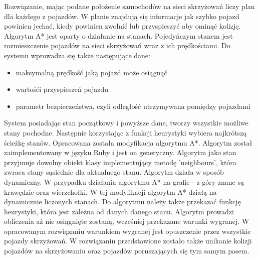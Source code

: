 Rozwiązanie, mając podane położenie samochodów na sieci skrzyżowań liczy plan dla każdego z pojazdów. W planie znajdują się informacje jak szybko pojazd powinien jechać, kiedy powinien zwolnić lub przyspieszyć aby ominąć kolizję.
\newline
\newline
Algorytm A* jest oparty o działanie na stanach. Pojedyńczym stanem jest rozmieszczenie pojazdów na sieci skrzyżowań wraz z ich prędkościami.
\newline
\newline
Do systemu wprowadza się także następujące dane:
\begin{itemize}
\item maksymalną prędkość jaką pojazd może osiągnąć
\item wartośći przyspieszeń pojazdu
\item parametr bezpieczeństwa, czyli odległość utrzymywana pomiędzy pojazdami
\end{itemize}
System posiadając stan początkowy i powyższe dane, tworzy wszystkie możliwe stany pochodne. Następnie korzystając z funkcji heurystyki wybiera najkrótszą ścieżkę stanów.
\newline
\newline
Opracowana została modyfikacja algorytmu A*. Algorytm został zaimplementowany w języku Ruby i jest on generyczny. Algorytm jako stan przyjmuje dowolny obiekt klasy implementujący metodę 'neighbours', która zwraca stany sąsiednie dla aktualnego stanu.
\newline
\newline
Algorytm działa w sposób dynamiczny. W przypadku działania algorytmu A* na grafie - z góry znane są krawędzie oraz wierzchołki. W tej modyfikacji algorytm A* działą na dynamicznie liczonych stanach.
\newline
\newline
Do algorytmu należy także przekazać funkcję heurystyki, która jest zależna od danych danego stanu.
\newline
\newline
Algorytm prowadzi obliczenia aż nie osiągnięte zostaną, wcześniej przekazane warunki wygranej.
\newline
\newline
W opracowanym rozwiązaniu warunkiem wygranej jest opuszczenie przez wszystkie pojazdy skrzyżowań.
\newline
\newline
W rozwiązaniu przedstawione zostało także unikanie kolizji pojazdów na skrzyżowaniu oraz pojazdów poruszających się tym samym pasem.
